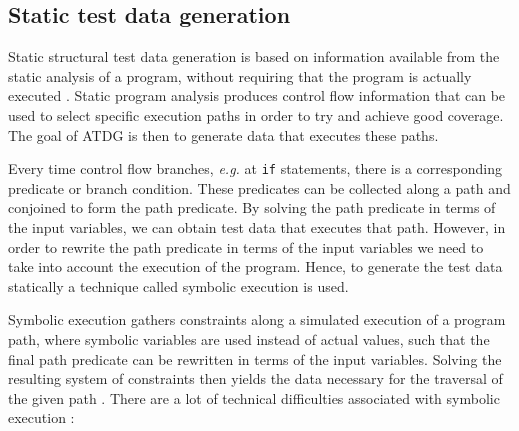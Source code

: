 \documentclass[a4paper,11pt,titlepage]{report}
\begin{document}

\subsection{Static test data generation}
Static structural test data generation is based on information available from the static analysis of a program, without requiring that the program is actually executed \cite{mcminn2004search}. Static program analysis produces control flow information that can be used to select specific execution paths in order to try and achieve good coverage. The goal of ATDG is then to generate data that executes these paths.

Every time control flow branches, \emph{e.g.} at \texttt{if} statements, there is a corresponding predicate or branch condition. These predicates can be collected along a path and conjoined to form the path predicate. By solving the path predicate in terms of the input variables, we can obtain test data that executes that path. However, in order to rewrite the path predicate in terms of the input variables we need to take into account the execution of the program. Hence, to generate the test data statically a technique called symbolic execution \cite{king1976symbolic} is used.

Symbolic execution gathers constraints along a simulated execution of a program path, where symbolic variables are used instead of actual values, such that the final path predicate can be rewritten in terms of the input variables. Solving the resulting system of constraints then yields the data necessary for the traversal of the given path \cite{king1975new, king1976symbolic}. There are a lot of technical difficulties associated with symbolic execution \cite{edvardsson1999survey,meudec2001atgen,mcminn2004search}:

\renewcommand{\labelitemi}{\tiny$\blacksquare$}
\end{document}
